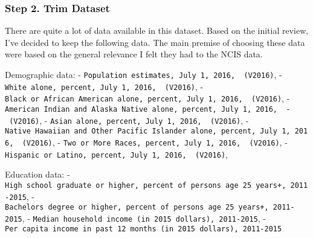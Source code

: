 \documentclass[11pt]{article}
\begin{document}
    \subsubsection{Step 2. Trim Dataset}\label{step-2.-trim-dataset}

There are quite a lot of data available in this dataset. Based on the
initial review, I've decided to keep the following data. The main
premise of choosing these data were based on the general relevance I
felt they had to the NCIS data.

Demographic data: -
\texttt{Population\ estimates,\ July\ 1,\ 2016,\ \ (V2016)}, -
\texttt{White\ alone,\ percent,\ July\ 1,\ 2016,\ \ (V2016)}, -
\texttt{Black\ or\ African\ American\ alone,\ percent,\ July\ 1,\ 2016,\ \ (V2016)},
-
\texttt{American\ Indian\ and\ Alaska\ Native\ alone,\ percent,\ July\ 1,\ 2016,\ \ -\ (V2016)},
- \texttt{Asian\ alone,\ percent,\ July\ 1,\ 2016,\ \ (V2016)}, -
\texttt{Native\ Hawaiian\ and\ Other\ Pacific\ Islander\ alone,\ percent,\ July\ 1,\ 2016,\ \ (V2016)},
- \texttt{Two\ or\ More\ Races,\ percent,\ July\ 1,\ 2016,\ \ (V2016)},
- \texttt{Hispanic\ or\ Latino,\ percent,\ July\ 1,\ 2016,\ \ (V2016)},

Education data: -
\texttt{High\ school\ graduate\ or\ higher,\ percent\ of\ persons\ age\ 25\ years+,\ 2011-2015},
-
\texttt{Bachelor\textquotesingle{}s\ degree\ or\ higher,\ percent\ of\ persons\ age\ 25\ years+,\ 2011-2015},
- \texttt{Median\ household\ income\ (in\ 2015\ dollars),\ 2011-2015}, -
\texttt{Per\ capita\ income\ in\ past\ 12\ months\ (in\ 2015\ dollars),\ 2011-2015}
\end{document}
